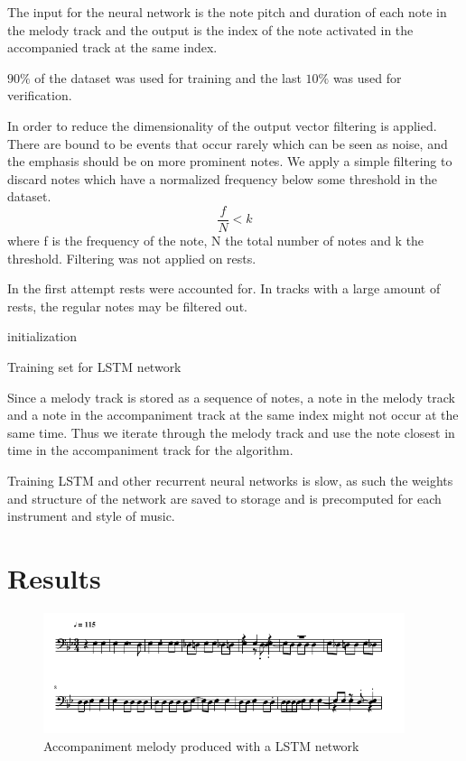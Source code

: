 The input for the neural network is the note pitch and duration of each note in the melody track and the output is the index of the note activated in the accompanied track at the same index. 


$90\%$ of the dataset was used for training and the last $10\%$ was used for verification.

In order to reduce the dimensionality of the output vector filtering is applied. There are bound to be events that occur rarely which can be seen as noise, and the emphasis should be on more prominent notes.
We apply a simple filtering to discard notes which have a normalized frequency below some threshold in the dataset.
\[ \frac{f}{N} < k \]
where f is the frequency of the note, N the total number of notes and k the threshold. Filtering was not applied on rests. 

In the first attempt rests were accounted for. In tracks with a large amount of rests, the regular notes may be filtered out.

\begin{algorithm}
 initialization\;
 
\caption{Training set for LSTM network}
\end{algorithm}
Since a melody track is stored as a sequence of notes, a note in the melody track and a note in the accompaniment track at the same index might not occur at the same time. Thus we iterate through the melody track and use the note closest in time in the accompaniment track for the algorithm.

Training \ac{LSTM} and other recurrent neural networks is slow, as such the weights and structure of the network are saved to storage and is precomputed for each instrument and style of music.

\section{Results}

\begin{figure}[h!]
\centerline{\includegraphics[width=400px]{../images/lstm_accomp.pdf}}
\caption{Accompaniment melody produced with a \ac{LSTM} network}
\label{ims:lstmaccomp}
\end{figure}

